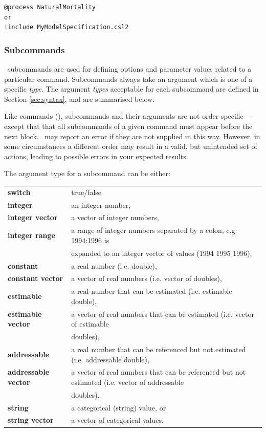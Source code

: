 {\small{\begin{verbatim}
@process NaturalMortality
or
!include MyModelSpecification.csl2
		\end{verbatim}}}

\subsubsection{Subcommands}

\CNAME\ subcommands are used for defining options and parameter values related to a particular command. Subcommands always take an argument which is one of a specific \emph{type}. The argument \emph{types} acceptable for each subcommand are defined in Section \ref{sec:syntax}, and are summarised below. 

Like commands (), subcommands and their arguments are not order specific --- except that that all subcommands of a given command must appear before the next  block. \CNAME\ may report an error if they are not supplied in this way. However, in some circumstances a different order may result in a valid, but unintended set of actions, leading to possible errors in your expected results.  

The argument type for a subcommand can be either:

\begin{tabular}{ll}
\textbf{switch} & true/false\\ 
\textbf{integer}& an integer number,\\
\textbf{integer vector} & a vector of integer numbers,\\
\textbf{integer range} & a range of integer numbers separated by a colon, e.g. 1994:1996 is \\ & expanded to an integer vector of values (1994 1995 1996),\\
\textbf{constant} & a real number (i.e. double),\\
\textbf{constant vector} & a vector of real numbers (i.e. vector of doubles),\\
\textbf{estimable} & a real number that can be estimated (i.e. estimable double),\\
\textbf{estimable vector} & a vector of real numbers that can be estimated (i.e. vector of estimable \\ & doubles),\\
\textbf{addressable} & a real number that can be referenced but not estimated (i.e. addressable double),\\
\textbf{addressable vector} & a vector of real numbers that can be referenced but not estimated (i.e. vector of addressable \\ & doubles),\\
\textbf{string} & a categorical (string) value, or\\
\textbf{string vector} & a vector of categorical values.
\end{tabular}

